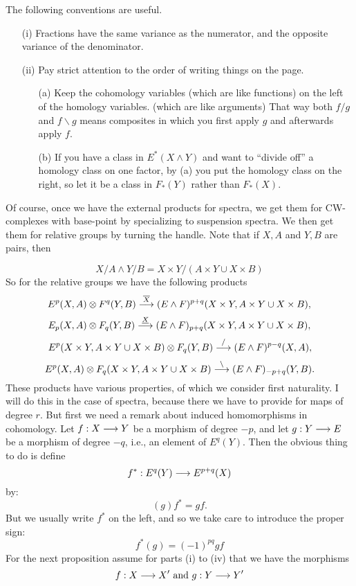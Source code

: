 \documentclass[../main]{subfiles}
\begin{document}
\begin{notes}
The following conventions are useful. 

\begin{enumerate}
    \item[(i)] Fractions have the same variance as the numerator, and the opposite variance of the denominator.
    \item [(ii)] Pay strict attention to the order of writing things on the page. 
    
    \begin{enumerate}
        \item[(a)] Keep the cohomology variables (which are like functions) on the left of the homology variables. (which are like arguments) That way both $f/g$ and $f \backslash g$ means composites in which you first apply $g$ and afterwards apply $f$.
        \item[(b)] If you have a class in $E^\ast(X \wedge Y)$ and want to ``divide off'' a homology class on one factor, by (a) you put the homology class on the right, so let it be a class in $F_\ast(Y)$ rather than $F_\ast(X)$.   
    \end{enumerate}
\end{enumerate}
\end{notes} 

Of course, once we have the external products for spectra, we get them for CW-complexes with base-point by specializing to suspension spectra. We then get them for relative groups by turning the handle. Note that if \(X, A\) and \(Y, B\) are pairs, then

$$X/A \wedge Y/B = X \times Y/(A \times Y \cup X \times B)$$
So for the relative groups we have the following products
$$E^p(X, A) \otimes F^q(Y, B) \overset{\overline X}{\longrightarrow} (E \wedge F)^{p + q}(X \times Y, A \times Y \cup X \times B),$$
$$E_p(X, A) \otimes F_q(Y, B) \overset{\underline X}{\longrightarrow} (E \wedge F)_{p + q}(X \times Y, A \times Y \cup X \times B),$$
$$E^p(X \times Y, A \times Y \cup X \times B) \otimes F_q(Y, B) \overset{/}{\longrightarrow} (E \wedge F)^{p - q}(X, A),$$
$$E^p(X, A) \otimes F_q(X \times Y, A \times Y \cup X \times B) \overset{\backslash}{\longrightarrow} (E \wedge F)_{-p + q}(Y, B).$$
These products have various properties, of which we consider first naturality. I will do this in the case of spectra, because there we have to provide for maps of degree $r$. But first we need a remark about induced homomorphisms in cohomology. Let \(f : X \overset{}{\longrightarrow} Y\) be a morphism of degree $-p$, and let $g : Y \overset{}{\longrightarrow} E$ be a morphism of degree $-q$, i.e., an element of $E^q(Y)$. Then the obvious thing to do is define 
$$f^\ast : E^q(Y) \overset{}{\longrightarrow} E^{p + q}(X)$$
by: 
$$(g)f^\ast = gf.$$
But we usually write $f^\ast$ on the left, and so we take care to introduce the proper sign: 
$$f^\ast(g) = (-1)^{p q} gf$$
For the next proposition assume for parts (i) to (iv) that we have the morphisms
$$f : X \overset{}{\longrightarrow} X' \text { and } g : Y \overset{}{\longrightarrow} Y'$$
\end{document}
